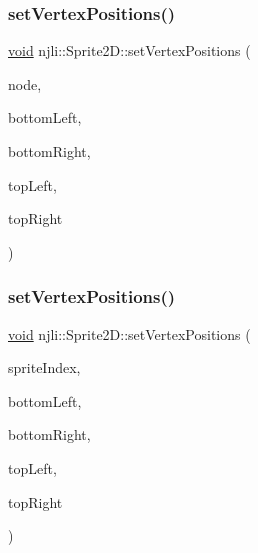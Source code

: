 \subsubsection{\texorpdfstring{set\+Vertex\+Positions()}{setVertexPositions()}\hspace{0.1cm}{\footnotesize\ttfamily [1/2]}}
{\footnotesize\ttfamily \mbox{\hyperlink{_thread_8h_af1e856da2e658414cb2456cb6f7ebc66}{void}} njli\+::\+Sprite2\+D\+::set\+Vertex\+Positions (\begin{DoxyParamCaption}\item[{\mbox{\hyperlink{classnjli_1_1_node}{Node}} $\ast$}]{node,  }\item[{const bt\+Vector2 \&}]{bottom\+Left,  }\item[{const bt\+Vector2 \&}]{bottom\+Right,  }\item[{const bt\+Vector2 \&}]{top\+Left,  }\item[{const bt\+Vector2 \&}]{top\+Right }\end{DoxyParamCaption})}

\mbox{\label{classnjli_1_1_sprite2_d_a1eb18ee4456f637f49d4f8af92c26d21}} 
\subsubsection{\texorpdfstring{set\+Vertex\+Positions()}{setVertexPositions()}\hspace{0.1cm}{\footnotesize\ttfamily [2/2]}}
{\footnotesize\ttfamily \mbox{\hyperlink{_thread_8h_af1e856da2e658414cb2456cb6f7ebc66}{void}} njli\+::\+Sprite2\+D\+::set\+Vertex\+Positions (\begin{DoxyParamCaption}\item[{const \mbox{\hyperlink{_util_8h_ad758b7a5c3f18ed79d2fcd23d9f16357}{u64}}}]{sprite\+Index,  }\item[{const bt\+Vector2 \&}]{bottom\+Left,  }\item[{const bt\+Vector2 \&}]{bottom\+Right,  }\item[{const bt\+Vector2 \&}]{top\+Left,  }\item[{const bt\+Vector2 \&}]{top\+Right }\end{DoxyParamCaption})\hspace{0.3cm}{\ttfamily [protected]}}

